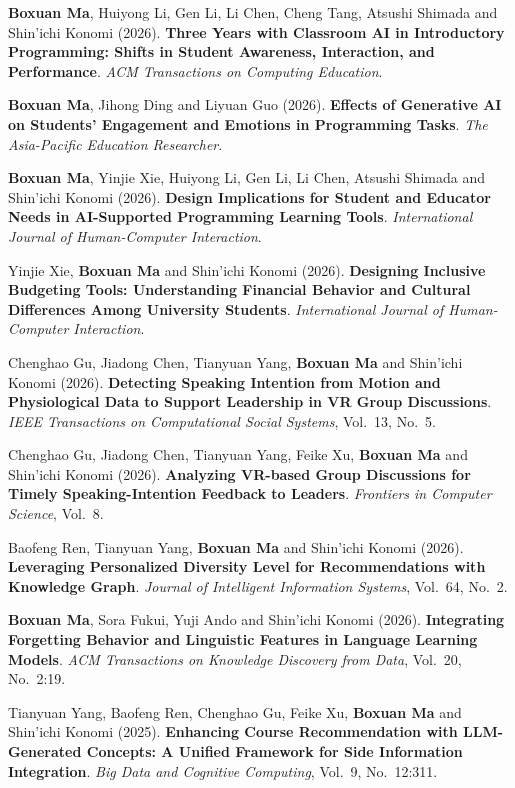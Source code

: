 \documentclass[a4paper,11pt]{article}
\begin{document}
\item[\textbf{[J.15]}] \textbf{Boxuan Ma}, Huiyong Li, Gen Li, Li Chen, Cheng Tang, Atsushi Shimada and Shin'ichi Konomi (2026). \textbf{Three Years with Classroom AI in Introductory Programming: Shifts in Student Awareness, Interaction, and Performance}. \textit{ACM Transactions on Computing Education}.
\item[\textbf{[J.14]}] \textbf{Boxuan Ma}, Jihong Ding and Liyuan Guo (2026). \textbf{Effects of Generative AI on Students' Engagement and Emotions in Programming Tasks}. \textit{The Asia-Pacific Education Researcher}.
\item[\textbf{[J.13]}] \textbf{Boxuan Ma}, Yinjie Xie, Huiyong Li, Gen Li, Li Chen, Atsushi Shimada and Shin'ichi Konomi (2026). \textbf{Design Implications for Student and Educator Needs in AI-Supported Programming Learning Tools}. \textit{International Journal of Human-Computer Interaction}.
\item[\textbf{[J.12]}] Yinjie Xie, \textbf{Boxuan Ma} and Shin'ichi Konomi (2026). \textbf{Designing Inclusive Budgeting Tools: Understanding Financial Behavior and Cultural Differences Among University Students}. \textit{International Journal of Human-Computer Interaction}.
\item[\textbf{[J.11]}] Chenghao Gu, Jiadong Chen, Tianyuan Yang, \textbf{Boxuan Ma} and Shin'ichi Konomi (2026). \textbf{Detecting Speaking Intention from Motion and Physiological Data to Support Leadership in VR Group Discussions}. \textit{IEEE Transactions on Computational Social Systems}, Vol.~13, No.~5.
\item[\textbf{[J.10]}] Chenghao Gu, Jiadong Chen, Tianyuan Yang, Feike Xu, \textbf{Boxuan Ma} and Shin'ichi Konomi (2026). \textbf{Analyzing VR-based Group Discussions for Timely Speaking-Intention Feedback to Leaders}. \textit{Frontiers in Computer Science}, Vol.~8.
\item[\textbf{[J.9]}] Baofeng Ren, Tianyuan Yang, \textbf{Boxuan Ma} and Shin'ichi Konomi (2026). \textbf{Leveraging Personalized Diversity Level for Recommendations with Knowledge Graph}. \textit{Journal of Intelligent Information Systems}, Vol.~64, No.~2.
\item[\textbf{[J.8]}] \textbf{Boxuan Ma}, Sora Fukui, Yuji Ando and Shin'ichi Konomi (2026). \textbf{Integrating Forgetting Behavior and Linguistic Features in Language Learning Models}. \textit{ACM Transactions on Knowledge Discovery from Data}, Vol.~20, No.~2:19.
\item[\textbf{[J.7]}] Tianyuan Yang, Baofeng Ren, Chenghao Gu, Feike Xu, \textbf{Boxuan Ma} and Shin'ichi Konomi (2025). \textbf{Enhancing Course Recommendation with LLM-Generated Concepts: A Unified Framework for Side Information Integration}. \textit{Big Data and Cognitive Computing}, Vol.~9, No.~12:311.
\end{document}
